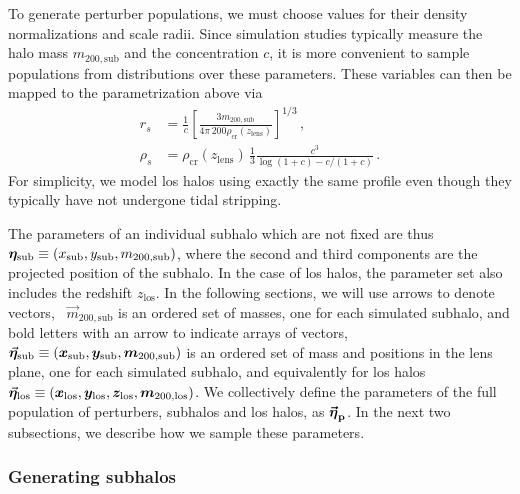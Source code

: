 To generate perturber populations, we must choose values for their density normalizations and scale radii. Since simulation studies typically measure the halo mass $m_\mathrm{200, sub}$ and the concentration $c$, it is more convenient to sample populations from distributions over these parameters. These variables can then be mapped to the parametrization above via
\begin{align}
    r_s &= \frac{1}{c} \left[ \frac{3 m_\mathrm{200, sub}}{4 \pi \, 200 \rho_\mathrm{cr}(z_\mathrm{lens})} \right]^{1/3} \, ,\\
    \rho_s &= \rho_\mathrm{cr}(z_\mathrm{lens}) \, \frac{1}{3} \frac{c^3}{\log(1+c) - c / (1 + c)} \, . 
\end{align}
For simplicity, we model \gls*{los} halos using exactly the same profile even though they typically have not undergone tidal stripping. 

The parameters of an individual subhalo which are not fixed are thus ${{\bm{\eta}}}_\mathrm{sub} \equiv (x_\mathrm{sub}, y_\mathrm{sub}, m_\mathrm{200, sub})$, where the second and third components are the projected position of the subhalo. In the case of \gls*{los} halos, the parameter set also includes the redshift $z_\mathrm{los}$. In the following sections, we will use arrows to denote vectors, \eg~$\vec{m}_\mathrm{200, sub}$ is an ordered set of masses, one for each simulated subhalo, and bold letters with an arrow to indicate arrays of vectors, \eg~ $\vec{{\bm{\eta}}}_\mathrm{sub} \equiv (\bm x_\mathrm{sub}, \bm y_\mathrm{sub}, \bm m_\mathrm{200, sub})$ is an ordered set of mass and positions in the lens plane, one for each simulated subhalo, and equivalently for \gls*{los} halos $\vec{{\bm{\eta}}}_\mathrm{los} \equiv (\bm x_\mathrm{los}, \bm y_\mathrm{{los}}, \bm z_\mathrm{{los}}, \bm m_\mathrm{200, {los}})$. We collectively define the parameters of the full population of perturbers, subhalos and \gls*{los} halos, as $\boldsymbol{\vec{{\bm{\eta}}}_\mathrm{p}}$. In the next two subsections, we describe how we sample these parameters.

\subsubsection{Generating subhalos} \label{subsubsec:sl-model-sub}

